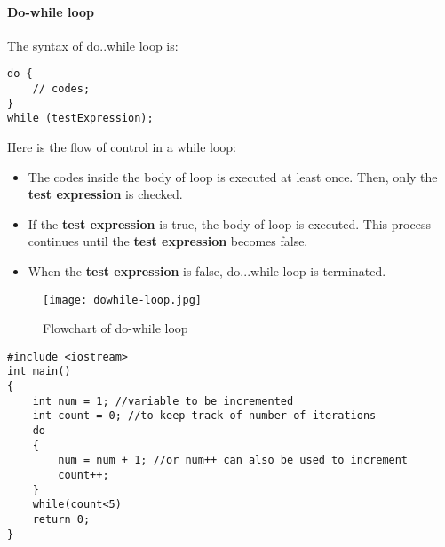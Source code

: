 \documentclass[11pt,fleqn]{book} %
\begin{document}
\paragraph{Do-while loop}
The syntax of do..while loop is:
\begin{lstlisting}
do {
	// codes;
}
while (testExpression);
\end{lstlisting}
Here is the flow of control in a while loop:
\begin{itemize}
\item The codes inside the body of loop is executed at least once. Then, only the \textbf{test expression} is checked.
\item If the \textbf{test expression} is true, the body of loop is executed. This process continues until the \textbf{test expression} becomes false.
\item When the \textbf{test expression} is false, do...while loop is terminated.
\end{itemize}
\begin{figure}[H]
	\centering
	\texttt{[image: dowhile-loop.jpg]}
	\caption{Flowchart of do-while loop}
\end{figure}
\begin{example}
	\begin{lstlisting}[title={Using While loop to increment an integer 5 times}, captionpos=b]
#include <iostream>
int main()
{
	int num = 1; //variable to be incremented
	int count = 0; //to keep track of number of iterations
	do
	{
		num = num + 1; //or num++ can also be used to increment
		count++;
	}
	while(count<5)
	return 0;
}
\end{lstlisting}
\end{example}
\end{document}
